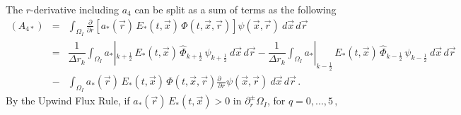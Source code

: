 \documentclass[11pt]{article}
\newcommand{\ot}{\frac{1}{2}}
\begin{document}
The $r$-derivative including $a_{4}$ can be split as a sum of terms as the following 
%
\begin{eqnarray*}
 (A_{4*}) & = & 
\int_{\Omega_{I}}
\frac{\partial }{\partial r} 
\left[ a_{*}(\vec{r}) \, E_{*}(t,\vec{x}) \, \Phi(t,\vec{x},\vec{r}) \right] 
\psi(\vec{x},\vec{r}) \: d\vec{x} \, d\vec{r}  
\\
& = & 
\dfrac{1}{\Delta r_{k}}
\int_{\Omega_{I}} 
a_{*}|_{k + \ot} \, E_{*}(t,\vec{x}) \, \hat{\Phi}_{k + \ot} \,
\psi_{k + \ot} \:  d\vec{x} \, d\vec{r}  
-
\dfrac{1}{\Delta r_{k}}
\int_{\Omega_{I}}
a_{*}|_{k - \ot} \, E_{*}(t,\vec{x}) \, \hat{\Phi}_{k - \ot} \,
\psi_{k - \ot} \:  d\vec{x} \, d\vec{r} 
\\
& - & %
\int_{\Omega_{I}}
a_{*}(\vec{r}) \, E_{*}(t,\vec{x}) \, \Phi(t,\vec{x},\vec{r})
\frac{\partial \mbox{ }}{\partial r} 
\psi(\vec{x},\vec{r}) \: d\vec{x} \, d\vec{r}  \, .
\end{eqnarray*}
%
By the Upwind Flux Rule, if $a_{*}(\vec{r}) \, E_{*}(t,\vec{x}) > 0$ in $\partial_r^{\pm} \Omega_{I}$, 
for $q = 0, ...,5 \, ,$ 
%
\end{document}
